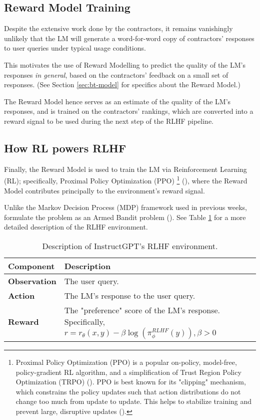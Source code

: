 \documentclass{article} %
\begin{document}
\subsection{Reward Model Training}

Despite the extensive work done by the contractors, it remains vanishingly unlikely 
that the LM will generate a word-for-word copy of contractors' responses to user 
queries under typical usage conditions. 

This motivates the use of Reward Modelling to predict the quality of the 
LM's responses \textit{in general}, based on the contractors' feedback 
on a small set of responses. (See Section \ref{sec:bt-model} for specifics about the Reward Model.)

The Reward Model hence serves as an estimate of the quality of the LM's responses,
and is trained on the contractors' rankings, which are converted into a reward signal
to be used during the next step of the RLHF pipeline.

\subsection{How RL powers RLHF}
Finally, the Reward Model is used to train the LM via Reinforcement Learning (RL);
specifically, Proximal Policy Optimization (PPO) \footnote{
    Proximal Policy Optimization (PPO) is a popular on-policy, model-free, policy-gradient RL algorithm,
    and a simplification of Trust Region Policy Optimization (TRPO)
    (\cite{Schulman-et-al-2015, Schulman-et-al-2017}).
    PPO is best known for its "clipping" mechanism, which constrains the policy updates
    such that action distributions do not change too much from update to update.
    This helps to stabilize training and prevent large, disruptive updates
    (\cite{Schulman-et-al-2017}).
} (\cite{Schulman-et-al-2017}),
where the Reward Model contributes principally to the environment's reward signal.

Unlike the Markov Decision Process (MDP) framework used in previous weeks,
\cite{InstructGPT-2022} formulate the problem as an Armed Bandit problem
(\cite{Sutton-and-Barto-1998}). See Table \ref{tab:rlhf_env} for a more detailed description 
of the RLHF environment.

\begin{table}[h!]
\centering
\begin{tabular}{p{}p{}}
\toprule
\textbf{Component} & \textbf{Description} \\
\midrule
\textbf{Observation} & The user query. \\
\midrule
\textbf{Action} & The LM's response to the user query. \\
\midrule
\textbf{Reward} & The "preference" score of the LM's response. Specifically,
    $r = r_\theta(x, y) - \beta \log(\pi_{\phi}^{RLHF}(y)), \beta > 0$ \\
\bottomrule
\end{tabular}
\caption{Description of InstructGPT's RLHF environment.}
\label{tab:rlhf_env}
\end{table}
\end{document}
